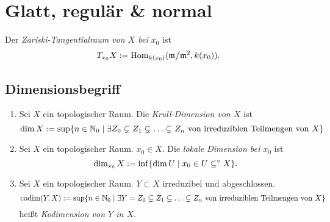 \section{Glatt, regulär \& normal} %

\begin{definition}
    Der \emph{Zariski-Tangentialraum von $X$ bei $x_0$} ist
    \[T_{x_0} X := \operatorname{Hom}_{k(x_0)}(\mathfrak{m}\big/\mathfrak{m}^2, k(x_0)).\]
\end{definition}

\subsection{Dimensionsbegriff}

\begin{definition}
\begin{enumerate}[label=(\roman*)]
  \item Sei $X$ ein topologischer Raum. Die \emph{Krull-Dimension von $X$} ist
    \[\dim X := \sup\{n\in\mathbb{N}_0 \mid
        \exists Z_0 \subsetneq Z_1 \subsetneq \ldots \subsetneq Z_n
        \text{ von irreduziblen Teilmengen von $X$}\}\]
  \item Sei $X$ ein topologischer Raum. $x_0 \in X$. Die 
    \emph{lokale Dimension bei $x_0$} ist
    \[\dim_{x_0} X := \inf\{\dim U \mid x_0\in U \subseteq^\circ X\}.\]
  \item Sei $X$ ein topologischer Raum. $Y\subset X$ irreduzibel und
    abgeschlossen. 
    \[\operatorname{codim}(Y,X) := \sup\{n\in\mathbb{N}_0 \mid
        \exists Y = Z_0 \subsetneq Z_1 \subsetneq \ldots \subsetneq Z_n
        \text{ von irreduziblen Teilmengen von $X$}\}\]
    heißt \emph{Kodimension von $Y$ in $X$}.
\end{enumerate}
\end{definition}

